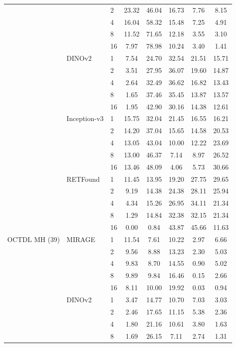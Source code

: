 \begin{longtable}{@{}lllccccc@{}}
 &  & 2 & 23.32 & 46.04 & 16.73 & 7.76 & 8.15 \\
 &  & 4 & 16.04 & 58.32 & 15.48 & 7.25 & 4.91 \\
 &  & 8 & 11.52 & 71.65 & 12.18 & 3.55 & 3.10 \\
 &  & 16 & 7.97 & 78.98 & 10.24 & 3.40 & 1.41 \\
\addlinespace[1pt]
 & DINOv2 & 1 & 7.54 & 24.70 & 32.54 & 21.51 & 15.71 \\
 &  & 2 & 3.51 & 27.95 & 36.07 & 19.60 & 14.87 \\
 &  & 4 & 2.64 & 32.49 & 36.62 & 16.82 & 13.43 \\
 &  & 8 & 1.65 & 37.46 & 35.45 & 13.87 & 13.57 \\
 &  & 16 & 1.95 & 42.90 & 30.16 & 14.38 & 12.61 \\
\addlinespace[1pt]
 & Inception-v3 & 1 & 15.75 & 32.04 & 21.45 & 16.55 & 16.21 \\
 &  & 2 & 14.20 & 37.04 & 15.65 & 14.58 & 20.53 \\
 &  & 4 & 13.05 & 43.04 & 10.00 & 12.22 & 23.69 \\
 &  & 8 & 13.00 & 46.37 & 7.14 & 8.97 & 26.52 \\
 &  & 16 & 13.46 & 48.09 & 4.06 & 5.73 & 30.66 \\
\addlinespace[1pt]
 & RETFound & 1 & 11.45 & 13.95 & 19.20 & 27.75 & 29.65 \\
 &  & 2 & 9.19 & 14.38 & 24.38 & 28.11 & 25.94 \\
 &  & 4 & 4.34 & 15.26 & 26.95 & 34.11 & 21.34 \\
 &  & 8 & 1.29 & 14.84 & 32.38 & 32.15 & 21.34 \\
 &  & 16 & 0.00 & 0.84 & 43.87 & 45.66 & 11.63 \\
\addlinespace[1pt]
OCTDL MH (39) & MIRAGE & 1 & 11.54 & 7.61 & 10.22 & 2.97 & 6.66 \\
 &  & 2 & 9.56 & 8.88 & 13.23 & 2.30 & 5.03 \\
 &  & 4 & 9.83 & 8.70 & 14.55 & 0.90 & 5.02 \\
 &  & 8 & 9.89 & 9.84 & 16.46 & 0.15 & 2.66 \\
 &  & 16 & 8.11 & 10.00 & 19.92 & 0.03 & 0.94 \\
\addlinespace[1pt]
 & DINOv2 & 1 & 3.47 & 14.77 & 10.70 & 7.03 & 3.03 \\
 &  & 2 & 2.46 & 17.65 & 11.15 & 5.38 & 2.36 \\
 &  & 4 & 1.80 & 21.16 & 10.61 & 3.80 & 1.63 \\
 &  & 8 & 1.69 & 26.15 & 7.11 & 2.74 & 1.31 \\

\end{longtable}
